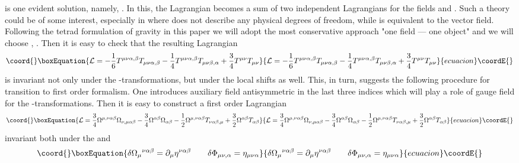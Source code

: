 \documentclass[a4paper,12pt]{article}
\begin{document}
is one evident solution, namely, \coordHE{}. In this, the
Lagrangian becomes a sum of two independent Lagrangians for the fields
\myHighlight{$\hat{\Phi}_{\mu\nu,\alpha}$}\coordHE{} and \coordHE{}. Such a theory
could be of some interest, especially in \coordHE{} where
\myHighlight{$\hat{\Phi}_{\mu\nu,\alpha}$}\coordHE{} does not describe any physical degrees
of freedom, while \coordHE{} is equivalent to the vector
field. Following the tetrad formulation of gravity in this paper we
will adopt the most conservative approach "one field --- one object"
and we will choose \coordHE{}, \coordHE{}. Then it is easy to check
that the resulting Lagrangian
\begin{equation}\coord{}\boxEquation{
{\cal L} = - \frac{1}{6} T^{\mu\nu\alpha,\beta} T_{\mu\nu\alpha,\beta}
- \frac{1}{4} T^{\mu\nu\alpha,\beta} T_{\mu\nu\beta,\alpha} +
\frac{3}{4} T^{\mu\nu} T_{\mu\nu}
}{
{\cal L} = - \frac{1}{6} T^{\mu\nu\alpha,\beta} T_{\mu\nu\alpha,\beta}
- \frac{1}{4} T^{\mu\nu\alpha,\beta} T_{\mu\nu\beta,\alpha} +
\frac{3}{4} T^{\mu\nu} T_{\mu\nu}
}{ecuacion}\coordE{}\end{equation}
is invariant not only under the \coordHE{}-transformations, but under
the local shifts \myHighlight{$\delta \Phi_{\mu\nu,\alpha} = \eta_{[\mu\nu\alpha]}$}\coordHE{}
as well. This, in turn, suggests the following procedure for
transition to first order formalism. One introduces auxiliary field
\myHighlight{$\Omega_{\mu,[\nu\alpha\beta]}$}\coordHE{} antisymmetric in the last three
indices which will play a role of gauge field for the
\myHighlight{$\eta$}\coordHE{}-transformations. Then it is easy to construct a first order
Lagrangian
\begin{equation}\coord{}\boxEquation{
{\cal L} = \frac{3}{4} \Omega^{\mu,\nu\alpha\beta}
\Omega_{\nu,\mu\alpha\beta} - \frac{3}{4} \Omega^{\alpha\beta}
\Omega_{\alpha\beta} - \frac{1}{2} \Omega^{\mu,\nu\alpha\beta}
T_{\nu\alpha\beta,\mu} + \frac{3}{2} \Omega^{\alpha\beta}
T_{\alpha\beta}
}{
{\cal L} = \frac{3}{4} \Omega^{\mu,\nu\alpha\beta}
\Omega_{\nu,\mu\alpha\beta} - \frac{3}{4} \Omega^{\alpha\beta}
\Omega_{\alpha\beta} - \frac{1}{2} \Omega^{\mu,\nu\alpha\beta}
T_{\nu\alpha\beta,\mu} + \frac{3}{2} \Omega^{\alpha\beta}
T_{\alpha\beta}
}{ecuacion}\coordE{}\end{equation}
invariant both under the \coordHE{} and
\begin{equation}\coord{}\boxEquation{
\delta \Omega_\mu{}^{\nu\alpha\beta} = \partial_\mu
\eta^{\nu\alpha\beta} \qquad \delta \Phi_{\mu\nu,\alpha} =
\eta_{\mu\nu\alpha}
}{
\delta \Omega_\mu{}^{\nu\alpha\beta} = \partial_\mu
\eta^{\nu\alpha\beta} \qquad \delta \Phi_{\mu\nu,\alpha} =
\eta_{\mu\nu\alpha}
}{ecuacion}\coordE{}\end{equation}
\end{document}
